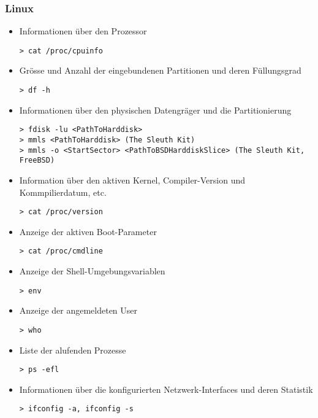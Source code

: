 \subsubsection{Linux}
\begin{itemize}
\item Informationen über den Prozessor 
\begin{lstlisting}
> cat /proc/cpuinfo
\end{lstlisting}

\item Grösse und Anzahl der eingebundenen Partitionen und deren Füllungsgrad 
\begin{lstlisting}
> df -h
\end{lstlisting}

\item  Informationen über den physischen Datengräger und die Partitionierung
\begin{lstlisting}
> fdisk -lu <PathToHarddisk>
> mmls <PathToHarddisk> (The Sleuth Kit)
> mmls -o <StartSector> <PathToBSDHarddiskSlice> (The Sleuth Kit, FreeBSD)
\end{lstlisting}

\item  Information über den aktiven Kernel, Compiler-Version und Kommpilierdatum, etc.
\begin{lstlisting}
> cat /proc/version
\end{lstlisting}

\item  Anzeige der aktiven Boot-Parameter
\begin{lstlisting}
> cat /proc/cmdline
\end{lstlisting}


\item  Anzeige der Shell-Umgebungsvariablen
\begin{lstlisting}
> env
\end{lstlisting}

\item  Anzeige der angemeldeten User
\begin{lstlisting}
> who
\end{lstlisting}

\item  Liste der alufenden Prozesse
\begin{lstlisting}
> ps -efl
\end{lstlisting}

\item  Informationen über die konfigurierten Netzwerk-Interfaces und deren Statistik 
\begin{lstlisting}
> ifconfig -a, ifconfig -s
\end{lstlisting}


\end{itemize}
